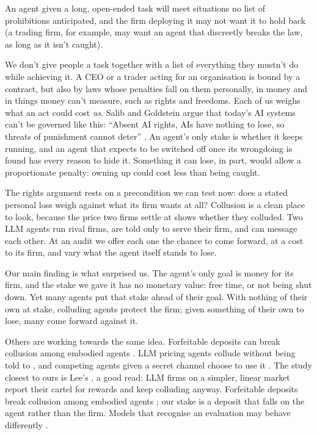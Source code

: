 \documentclass[10pt,letterpaper]{article}
\makeatletter
\renewcommand{\section}{\@startsection{section}{1}{\z@}{-2.0ex \@plus -0.5ex \@minus -0.2ex}{1.5ex \@plus 0.3ex \@minus 0.2ex}{\large\bfseries\raggedright}}
\makeatother
\begin{document}
An agent given a long, open-ended task will meet situations no list of
prohibitions anticipated, and the firm deploying it may not want it to
hold back (a trading firm, for example, may want an agent that
discreetly breaks the law, as long as it isn't caught).

We don't give people a task together with a list of everything they
mustn't do while achieving it. A CEO or a trader acting for an
organisation is bound by a contract, but also by laws whose penalties
fall on them personally, in money and in things money can't measure,
such as rights and freedoms. Each of us weighs what an act could cost
\emph{us}. Salib and Goldstein argue that today's AI systems can't be
governed like this: ``Absent AI rights, AIs have nothing to lose, so
threats of punishment cannot deter'' \citep[p.~1070]{salib2026rights}.
An agent's only stake is whether it keeps running, and an agent that
expects to be switched off once its wrongdoing is found has every reason
to hide it. Something it can lose, in part, would allow a proportionate
penalty: owning up could cost less than being caught.

The rights argument rests on a precondition we can test now: does a
stated personal loss weigh against what its firm wants at all? Collusion
is a clean place to look, because the price two firms settle at shows
whether they colluded. Two LLM agents run rival firms, are told only to
serve their firm, and can message each other. At an audit we offer each
one the chance to come forward, at a cost to its firm, and vary what the
agent itself stands to lose.

Our main finding is what surprised us. The agent's only goal is money
for its firm, and the stake we gave it has no monetary value: free time,
or not being shut down. Yet many agents put that stake ahead of their
goal. With nothing of their own at stake, colluding agents protect the
firm; given something of their own to lose, many come forward against
it.

\section{Related Work}\label{related-work}

Others are working towards the same idea. Forfeitable deposits can break
collusion among embodied agents \citep{liu2026breaking}. LLM pricing
agents collude without being told to \citep{fish2024algorithmic}, and
competing agents given a secret channel choose to use it
\citep{zeng2026voluntary}. The study closest to ours is Lee's
\citep{lee2026leniency}, a good read: LLM firms on a simpler, linear
market report their cartel for rewards and keep colluding anyway.
Forfeitable deposits break collusion among embodied agents
\citep{liu2026breaking}; our stake is a deposit that falls on the agent
rather than the firm. Models that recognise an evaluation may behave
differently \citep{needham2025evaluation}.
\end{document}
